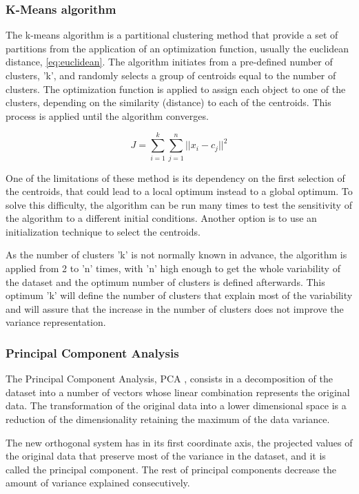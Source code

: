 \subsubsection{K-Means algorithm}

The k-means algorithm is a partitional clustering method that provide a set of partitions from the application of an optimization function, usually the euclidean distance, \ref{eq:euclidean}. The algorithm initiates from a pre-defined number of clusters, 'k', and randomly selects a group of centroids equal to the number of clusters. The optimization function is applied to assign each object to one of the clusters, depending on the similarity (distance) to each of the centroids. This process is applied until the algorithm converges.

\begin{equation}\label{eq:euclidean}
    J =\sum_{i=1}^{k}\sum_{j=1}^{n}{||x_i-c_j||}^2
\end{equation}

One of the limitations of these method is its dependency on the first selection of the centroids, that could lead to a local optimum instead to a global optimum. To solve this difficulty, the algorithm can be run many times to test the sensitivity of the algorithm to a different initial conditions. Another option is to use an initialization technique to select the centroids.

As the number of clusters 'k' is not normally known in advance, the algorithm is applied from 2 to 'n' times, with 'n' high enough to get the whole variability of the dataset and the optimum number of clusters is defined afterwards. This optimum 'k' will define the number of clusters that explain most of the variability and will assure that the increase in the number of clusters does not improve the variance representation.

\subsubsection{Principal Component Analysis}

The Principal Component Analysis, PCA \cite*{jolliffe2011}, consists in a decomposition of the dataset into a number of vectors whose linear combination represents the original data. The transformation of the original data into a lower dimensional space is a reduction of the dimensionality retaining the maximum of the data variance.

The new orthogonal system has in its first coordinate axis, the projected values of the original data that preserve most of the variance in the dataset, and it is called the principal component. The rest of principal components decrease the amount of variance explained consecutively.

